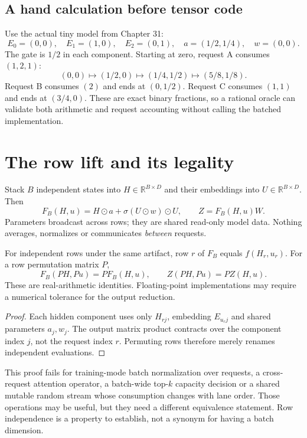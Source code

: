 \subsection{A hand calculation before tensor code}
Use the actual tiny model from Chapter 31:
\[
 E_0=(0,0),\quad E_1=(1,0),\quad E_2=(0,1),\quad
 a=(1/2,1/4),\quad w=(0,0).
\]
The gate is $1/2$ in each component. Starting at zero, request A consumes
$(1,2,1)$:
\[
 (0,0)\mapsto(1/2,0)\mapsto(1/4,1/2)\mapsto(5/8,1/8).
\]
Request B consumes $(2)$ and ends at $(0,1/2)$. Request C consumes $(1,1)$
and ends at $(3/4,0)$. These are exact binary fractions, so a rational oracle
can validate both arithmetic and request accounting without calling the
batched implementation.

\section{The row lift and its legality}
\label{evod34:lift}
Stack $B$ independent states into $H\in\mathbb R^{B\times D}$ and their
embeddings into $U\in\mathbb R^{B\times D}$. Then
\[
 F_B(H,u)=H\odot a+\sigma(U\odot w)\odot U,\qquad Z=F_B(H,u)W.
\]
Parameters broadcast across rows; they are shared read-only model data.
Nothing averages, normalizes or communicates \emph{between} requests.

\begin{proposition}
For independent rows under the same artifact, row $r$ of $F_B$ equals
$f(H_r,u_r)$. For a row permutation matrix $P$,
\[
 F_B(PH,Pu)=PF_B(H,u),\qquad Z(PH,Pu)=PZ(H,u).
\]
These are real-arithmetic identities. Floating-point implementations may
require a numerical tolerance for the output reduction.
\end{proposition}
\begin{proof}
Each hidden component uses only $H_{rj}$, embedding $E_{u_rj}$ and shared
parameters $a_j,w_j$. The output matrix product contracts over the component
index $j$, not the request index $r$. Permuting rows therefore merely renames
independent evaluations.
\end{proof}

This proof fails for training-mode batch normalization over requests, a
cross-request attention operator, a batch-wide top-$k$ capacity decision or a
shared mutable random stream whose consumption changes with lane order.
Those operations may be useful, but they need a different equivalence
statement. Row independence is a property to establish, not a synonym for
having a batch dimension.

